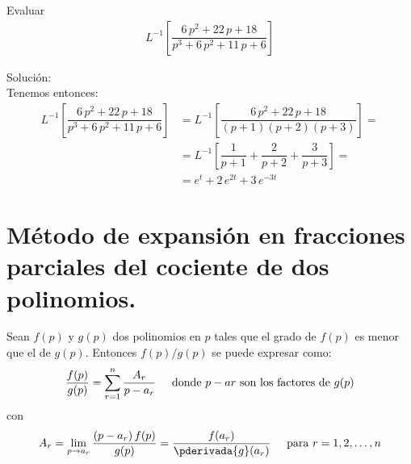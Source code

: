 \begin{ejemplo} Evaluar
\begin{align*}
L^{-1} \left[ \dfrac{6 \, p^{2} + 22 \, p + 18}{p^{3} + 6 \, p^{2} + 11 \, p + 6} \right]
\end{align*}

\noindent Solución:
\\[0.5em]
Tenemos entonces:
\begin{align*}
L^{-1} \left[ \dfrac{6 \, p^{2} + 22 \, p + 18}{p^{3} + 6 \, p^{2} + 11 \, p + 6} \right] &= L^{-1} \left[ \dfrac{6 \, p^{2} + 22 \, p + 18}{(p + 1)(p + 2)(p + 3)} \right] = \\[0.5em]
&= L^{-1} \left[ \dfrac{1}{p + 1} + \dfrac{2}{p + 2} + \dfrac{3}{p + 3} \right] = \\[0.5em]
&= e^{t} + 2 \, e^{2 t} + 3 \, e^{- 3 t}
\end{align*}
\end{ejemplo}

\section{Método de expansión en fracciones parciales del cociente de dos polinomios.}

Sean $f (p)$ y $g (p)$ dos polinomios en $p$ tales que el grado de $f (p)$ es menor que el de $g (p)$. Entonces $f (p) / g (p)$ se puede expresar como:
\begin{align*}
\dfrac{f (p)}{g (p)} = \sum_{r=1}^{n} \dfrac{A_{r}}{p - a_{r}} \hspace{0.5cm} \mbox{donde } p - a{r} \mbox{ son los factores de } g (p)
\end{align*}
con
\begin{align*}
A_{r} = \lim_{p \to a_{r}} \dfrac{(p - a_{r}) \, f (p)}{g (p)} = \dfrac{f(a_{r})}{\pderivada{g} (a_{r})} \hspace{0.5cm} \mbox{para  } r = 1, 2, \ldots, n
\end{align*}

